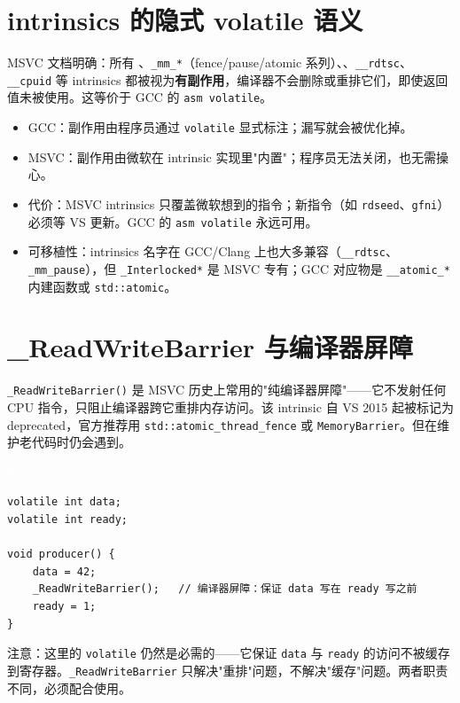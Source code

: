 \documentclass[12pt,a4paper,fontset=fandol]{ctexbook}
\newcommand{\cpplabel}{%
  \begin{tcolorbox}[enhanced,colback=cppheadbg,colframe=cppheadbg,
    arc=1mm,boxrule=0mm,left=6pt,right=6pt,top=2pt,bottom=2pt,
    halign=left,oversize]
    \textcolor{white}{\small\bfseries C++}
  \end{tcolorbox}\vspace{-4pt}}
\newcommand{\kw}[1]{\texttt{#1}}
\begin{document}
\section{intrinsics 的隐式 volatile 语义}\label{sec:intrinsic-volatile}

MSVC 文档明确：所有 、\texttt{\_mm\_*}（fence/pause/atomic 系列）、、\texttt{\_\_rdtsc}、\texttt{\_\_cpuid} 等 intrinsics 都被视为\textbf{有副作用}，编译器不会删除或重排它们，即使返回值未被使用。这等价于 GCC 的 \texttt{asm volatile}。

\begin{tcolorbox}[compare={GCC asm volatile vs MSVC intrinsics}]
\begin{itemize}[nosep]
  \item GCC：副作用由程序员通过 \texttt{volatile} 显式标注；漏写就会被优化掉。
  \item MSVC：副作用由微软在 intrinsic 实现里"内置"；程序员无法关闭，也无需操心。
  \item 代价：MSVC intrinsics 只覆盖微软想到的指令；新指令（如 \texttt{rdseed}、\texttt{gfni}）必须等 VS 更新。GCC 的 \texttt{asm volatile} 永远可用。
  \item 可移植性：intrinsics 名字在 GCC/Clang 上也大多兼容（\texttt{\_\_rdtsc}、\texttt{\_mm\_pause}），但 \texttt{\_Interlocked*} 是 MSVC 专有；GCC 对应物是 \texttt{\_\_atomic\_*} 内建函数或 \texttt{std::atomic}。
\end{itemize}
\end{tcolorbox}

\section{\_ReadWriteBarrier 与编译器屏障}\label{sec:msvc-barrier}

\texttt{\_ReadWriteBarrier()} 是 MSVC 历史上常用的"纯编译器屏障"——它不发射任何 CPU 指令，只阻止编译器跨它重排内存访问。该 intrinsic 自 VS 2015 起被标记为 deprecated，官方推荐用 \texttt{std::atomic\_thread\_fence} 或 \texttt{MemoryBarrier}。但在维护老代码时仍会遇到。

\cpplabel
\begin{lstlisting}[style=cppstyle]
volatile int data;
volatile int ready;

void producer() {
    data = 42;
    _ReadWriteBarrier();   // 编译器屏障：保证 data 写在 ready 写之前
    ready = 1;
}
\end{lstlisting}

注意：这里的 \kw{volatile} 仍然是必需的——它保证 \texttt{data} 与 \texttt{ready} 的访问不被缓存到寄存器。\texttt{\_ReadWriteBarrier} 只解决"重排"问题，不解决"缓存"问题。两者职责不同，必须配合使用。
\end{document}
